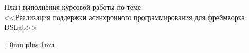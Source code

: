 \documentclass{article}[a4paper, 14pt]
\begin{document}

\newpage 


\vspace*{\fill}

\begin{center}
    \huge
    План выполнения курсовой работы по теме \\
    <<Реализация поддержки асинхронного программирования для фреймворка DSLab>>
\end{center}
    
\vspace*{\fill}

\newpage

\tableofcontents


\newpage


\newpage
{}

\Urlmuskip=0mu plus 1mu\relax

\printbibliography

\end{document}
